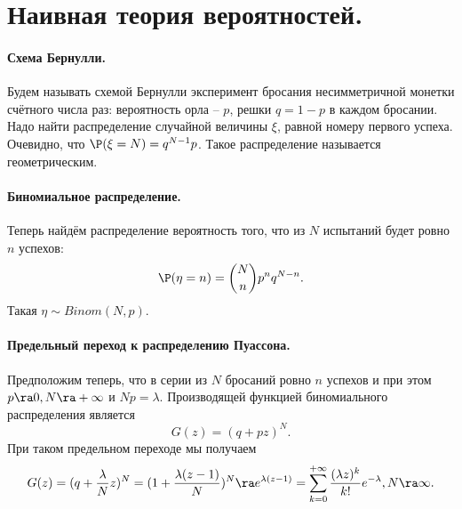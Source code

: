 \section{Наивная теория вероятностей.}
\paragraph{Схема Бернулли.}
Будем называть схемой Бернулли эксперимент бросания несимметричной монетки счётного числа раз: вероятность орла -- $p$, решки $q = 1 - p$ в каждом бросании.
Надо найти распределение случайной величины $\xi$, равной номеру первого успеха.
Очевидно, что $\P(\xi = N) = q^{N - 1}p$.
Такое распределение называется геометрическим.
\paragraph{Биномиальное распределение.}
Теперь найдём распределение вероятность того, что из $N$ испытаний будет ровно $n$ успехов:
\[
    \P(\eta = n) = \binom{N}{n}p^{n}q^{N - n}.
\]
Такая $\eta \sim Binom(N, p)$.
\paragraph{Предельный переход к распределению Пуассона.}
Предположим теперь, что в серии из $N$ бросаний ровно $n$ успехов и при этом $p \ra 0, N \ra +\infty$ и $Np = \lambda$.
Производящей функцией биномиального распределения является
\[
    G(z) = (q + pz)^N.
\]
При таком предельном переходе мы получаем
\[
    G(z) = (q + \dfrac{\lambda}{N}z)^N = (1 + \dfrac{\lambda(z - 1)}{N})^N \ra e^{\lambda (z - 1)} = \sum\limits_{k = 0}^{+\infty} \dfrac{(\lambda z)^k}{k!}e^{-\lambda}, N \ra \infty.
\]
